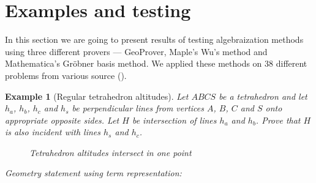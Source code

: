 \documentclass[final,1p,times,authoryear]{elsarticle}
\newtheorem{example}[theorem]{Example}
\begin{document}
\section{Examples and testing}

In this section we are going to present results of testing
algebraization methods using three different provers --- GeoProver,
Maple's Wu's method and Mathematica's Gr\"obner basis method. We
applied these methods on 38 different problems from various source
(\cite{janicic1997zbirka, shao2016challenging, arhzbirka, kinknjiga}).

\begin{example}[Regular tetrahedron altitudes] 
Let $ABCS$ be a tetrahedron and let $h_a$, $h_b$, $h_c$ and $h_s$ be
perpendicular lines from vertices $A$, $B$, $C$ and $S$ onto
appropriate opposite sides. Let $H$ be intersection of lines $h_a$ and
$h_b$. Prove that $H$ is also incident with lines $h_s$ and $h_c$.

\begin{figure}[!hb]
\begin{center}

\end{center}
\caption{Tetrahedron altitudes intersect in one point}
\end{figure}

Geometry statement using term representation:


\end{example}
\end{document}
